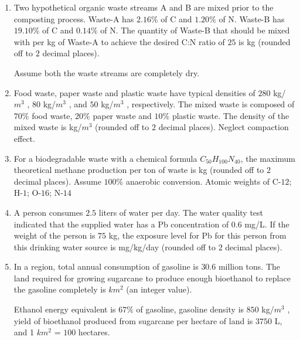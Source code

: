 \documentclass[journal]{IEEEtran}
\numberwithin{equation}{enumi}
\numberwithin{figure}{enumi}
\begin{document}
\begin{enumerate}[start=1, label={Q\arabic*.}]
\vspace{0.3cm}
\item Two hypothetical organic waste streams A and B are mixed prior to the composting
process. Waste-A has $2.16\%$ of C and $1.20\%$ of N. Waste-B has $19.10\%$ of C and $0.14\%$
of N. The quantity of Waste-B that should be mixed with per kg of Waste-A to achieve
the desired C:N ratio of $25$ is \underline{\hspace{1.5cm}}kg (rounded off to $2$ decimal places).

Assume both the waste streams are completely dry.

\vspace{0.3cm}
\item Food waste, paper waste and plastic waste have typical densities of $280$ kg/$m^3$
, $80$ kg/$m^3$
,
and $50$ kg/$m^3$
, respectively. The mixed waste is composed of $70\%$ food waste, $20\%$ paper
waste and $10\%$ plastic waste. The density of the mixed waste is \underline{\hspace{1.5cm}}kg/$m^3$
(rounded
off to $2$ decimal places).
Neglect compaction effect.

\vspace{0.3cm}
\item For a biodegradable waste with a chemical formula $C_{50}H_{100}N_{40}$, the maximum
theoretical methane production per ton of waste is \underline{\hspace{1.5cm}} kg (rounded off to $2$ decimal
places).
Assume $100\%$ anaerobic conversion. Atomic weights of C-$12$; H-$1$; O-$16$; N-$14$

\vspace{0.3cm}
\item A person consumes $2.5$ liters of water per day. The water quality test indicated that the
supplied water has a Pb concentration of $0.6$ mg/L. If the weight of the person is $75$ kg,
the exposure level for Pb for this person from this drinking water source is \underline{\hspace{1.5cm}} mg/kg/day (rounded off to $2$ decimal places).

\vspace{0.3cm}
\item In a region, total annual consumption of gasoline is $30.6$ million tons. The land required
for growing sugarcane to produce enough bioethanol to replace the gasoline completely
is \underline{\hspace{1.5cm}} $km^2$ (an integer value).

Ethanol energy equivalent is $67\%$ of gasoline, gasoline density is $850$ kg/$m^3$
, yield of
bioethanol produced from sugarcane per hectare of land is $3750$ L, and 1 $km^2$ = $100$ hectares.


\end{enumerate}
\end{document}
